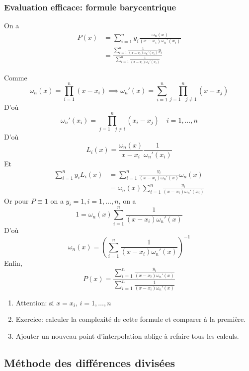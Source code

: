 \subsubsection{Evaluation efficace: formule barycentrique}
\begin{prop}
   On a 
   \begin{align*}
       P(x) &= \sum_{i=1}^{n} y_i \frac{\omega_n(x)}{(x - x_i)\omega_n'(x_i)}\\
            &= \frac{\sum_{i=1}^{n} \frac{1}{(x - x_i)\omega_n'(x_i)}y_i}{\sum_{i=1}^{n} \frac{1}{(x - x_i)\omega_n'(x_i)}}
   \end{align*}
\end{prop}
\begin{preuve}
   Comme 
   \[
   \omega_n(x) = \prod_{i=1}^{n} (x - x_i) \implies \omega_n'(x) = \sum_{i=1}^{n} \prod_{j=1 \quad j \neq 1}^{n} (x - x_j)  
   \] 
   D'où
   \[
   \omega_n'(x_i) = \prod_{j=1 \quad j \neq i}^{n} (x_i - x_j) \quad i = 1, \ldots, n
   \] 
   D'où 
   \[
   L_i(x) = \frac{\omega_n(x)}{x - x_i}\frac{1}{\omega_n'(x_i)}
   \] 
   Et 
   \begin{align*}
       \sum_{i=1}^{n} y_iL_i(x) &= \sum_{i=1}^{n} \frac{y_i}{(x - x_i)\omega_n'(x)}\omega_n(x)\\
                                &= \omega_n(x) \sum_{i=1}^{n} \frac{y_i}{(x - x_i)\omega_n'(x_i)}
   \end{align*}
   Or pour $P \equiv 1$ on a  $y_i = 1, i = 1, \ldots, n$, on a
   \[
   1 = \omega_n(x) \sum_{i=1}^{n} \frac{1}{(x - x_i)\omega_n'(x)}
   \] 
   D'où
   \[
       \omega_n(x) = \left(   \sum_{i=1}^{n} \frac{1}{(x - x_i)\omega_n'(x)}\right)^{-1}
   \] 
   Enfin,
   \[
   P(x) = \frac{\sum_{i=1}^{n} \frac{y_i}{(x - x_i)\omega_n'(x)}}{\sum_{i=1}^{n} \frac{1}{(x - x_i)\omega_n'(x)}}
   \] 
\end{preuve}
\begin{remark}
   \begin{enumerate}
       \item Attention: si $x = x_i, \, i = 1, \ldots, n$
       \item Exercice: calculer la complexité de cette formule et comparer à la première.
       \item Ajouter un nouveau point d'interpolation ablige à refaire tous les calculs.
   \end{enumerate} 
\end{remark}

\subsection{Méthode des différences divisées}
